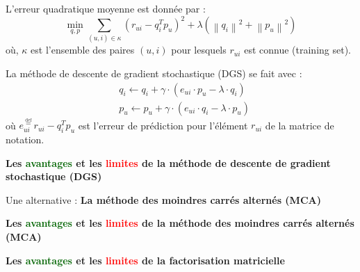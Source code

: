\begin{frame}{\PartieI}
    L'erreur quadratique moyenne est donnée par :
    \begin{equation*}
        \min _{q, p} \sum_{(u, i) \in \kappa}\left(r_{u i}-q_i^T p_u\right)^2+\lambda\left(\left\|q_i\right\|^2+\left\|p_u\right\|^2\right)
    \end{equation*}
    où, $\kappa$ est l'ensemble des paires $(u,i)$ pour lesquels $r_{ui}$ est connue (training set).
\end{frame}

\begin{frame}{\PartieI}
    La méthode de descente de gradient stochastique (DGS) se fait avec :
    \begin{equation*}
        \begin{aligned}
             & q_i \leftarrow q_i+\gamma \cdot\left(e_{u i} \cdot p_u-\lambda \cdot q_i\right) \\
             & p_u \leftarrow p_u+\gamma \cdot\left(e_{u i} \cdot q_i-\lambda \cdot p_u\right)
        \end{aligned}
    \end{equation*}
    où $e_{u i}^{\stackrel{\text { def }}{=}} r_{u i}-q_i^T p_u$ est l'erreur de prédiction pour l'élément $r_{ui}$ de la matrice de notation.
\end{frame}

\begin{frame}{\PartieI}
    \begin{center}
        \textbf{\large{Les \textcolor{darkgreen}{avantages} et les \textcolor{red}{limites} de la méthode de descente de gradient stochastique (DGS)}}
    \end{center}
\end{frame}

\begin{frame}{\PartieI}
    \begin{center}
        \large{Une alternative : \textbf{La méthode des moindres carrés alternés (MCA)}}
    \end{center}
\end{frame}

\begin{frame}{\PartieI}
    \begin{center}
        \textbf{\large{Les \textcolor{darkgreen}{avantages} et les \textcolor{red}{limites} de la méthode des moindres carrés alternés (MCA)}}
    \end{center}
\end{frame}

\begin{frame}{\PartieI}
    \begin{center}
        \textbf{\large{Les \textcolor{darkgreen}{avantages} et les \textcolor{red}{limites} de la factorisation matricielle}}
    \end{center}
\end{frame}